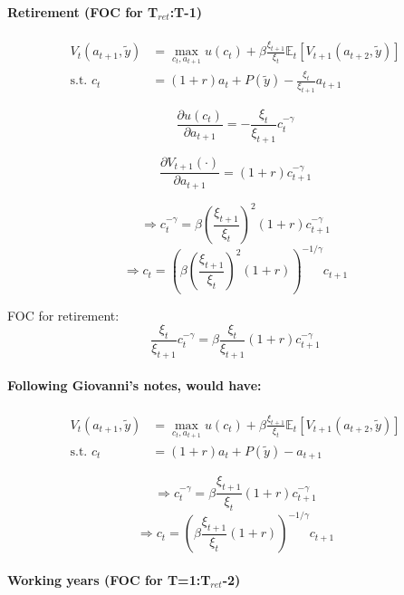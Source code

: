 \documentclass[11pt]{article}
\begin{document}
\paragraph{Retirement (FOC for T$_{ret}$:T-1)}

\begin{equation*}
\begin{split}
 V_{t}(a_{t+1}, \tilde{y}) &= \max_{c_t,a_{t+1}} u(c_{t}) + \beta \frac{\xi_{t+1}}{\xi_{t}} \mathbb{E}_t[V_{t+1}(a_{t+2}, \tilde{y})] \\
  \text{s.t. } c_t &= (1+r) a_{t}+P(\tilde{y}) - \frac{\xi_{t}}{\xi_{t+1}} a_{t+1}
\end{split}
\end{equation*}

$$ \frac{\partial{u(c_t)}}{\partial{a_{t+1}}} = -\frac{\xi_t}{\xi_{t+1}} c_t^{-\gamma} $$

$$ \frac{\partial{V_{t+1}(\cdot)}}{\partial{a_{t+1}}} = (1+r) c_{t+1}^{-\gamma} $$

$$ \Rightarrow c_t^{-\gamma} = \beta \left(
    \frac{\xi_{t+1}}{\xi_t} \right) ^2 (1+r) c_{t+1}^{-\gamma} $$
$$ \Rightarrow c_t = \left(\beta \left(
    \frac{\xi_{t+1}}{\xi_t} \right) ^2 (1+r) \right)^{-1/\gamma} c_{t+1} $$

FOC for retirement:
$$ \frac{\xi_t}{\xi_{t+1}} c_t^{-\gamma} = \beta \frac{\xi_t}{\xi_{t+1}} (1+r) c_{t+1}^{-\gamma} $$


\paragraph{Following Giovanni's notes, would have:}
\begin{equation*}
\begin{split}
 V_{t}(a_{t+1}, \tilde{y}) &= \max_{c_t,a_{t+1}} u(c_{t}) + \beta \frac{\xi_{t+1}}{\xi_{t}} \mathbb{E}_t[V_{t+1}(a_{t+2}, \tilde{y})] \\
 \text{s.t. } c_t &= (1+r) a_{t}+P(\tilde{y}) - a_{t+1}
\end{split}
\end{equation*}

$$ \Rightarrow c_t^{-\gamma} = \beta \frac{\xi_{t+1}}{\xi_t} (1+r) c_{t+1}^{-\gamma} $$
$$ \Rightarrow c_t = \left(\beta \frac{\xi_{t+1}}{\xi_t} (1+r) \right)^{-1/\gamma} c_{t+1} $$


\paragraph{Working years (FOC for T=1:T$_{ret}$-2)}
\end{document}
